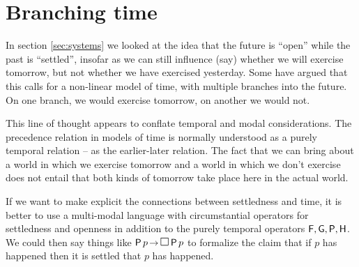 


\section{Branching time}\label{sec:branching}

In section \ref{sec:systems} we looked at the idea that the future is ``open''
while the past is ``settled'', insofar as we can still influence (say)
whether we will exercise tomorrow, but not whether we have exercised
yesterday. Some have argued that this calls for a non-linear model of time, with
multiple branches into the future. On one branch, we would exercise tomorrow, on
another we would not.

This line of thought appears to conflate temporal and modal considerations.
The precedence relation in models of time is normally understood as a purely
temporal relation -- as the earlier-later relation. The fact that we can bring
about a world in which we exercise tomorrow and a world in which we don't
exercise does not entail that both kinds of tomorrow take place here in the
actual world.

If we want to make explicit the connections between settledness and time, it is
better to use a multi-modal language with circumstantial operators for
settledness and openness in addition to the purely temporal operators
$\operatorname{\mathsf{F}}, \operatorname{\mathsf{G}}, \operatorname{\mathsf{P}}, \operatorname{\mathsf{H}}$. We could then say things like $\tP p \to \Box \tP p$ to
formalize the claim that if $p$ has happened then it is settled that $p$ has
happened.


